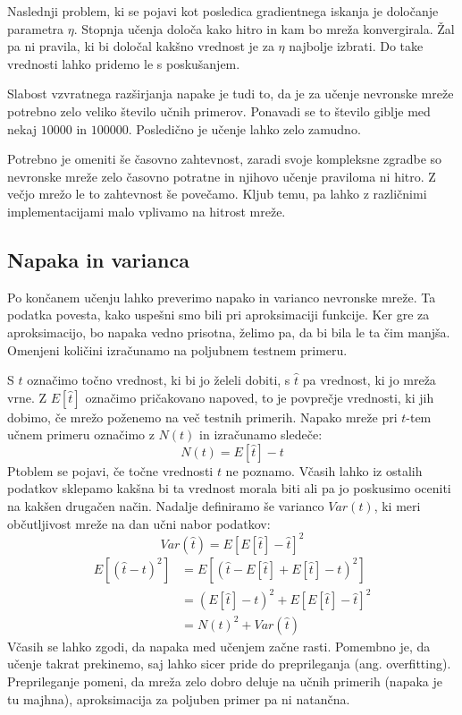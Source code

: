 \documentclass[mat1]{fmfdelo}
\begin{document}
Naslednji problem, ki se pojavi kot posledica gradientnega iskanja je določanje parametra $\eta$. Stopnja učenja določa kako hitro in kam bo mreža konvergirala. Žal pa ni pravila, ki bi določal kakšno vrednost je za $\eta$ najbolje izbrati. Do take vrednosti lahko pridemo le s poskušanjem.

Slabost vzvratnega razširjanja napake je tudi to, da je za učenje nevronske mreže potrebno zelo veliko število učnih primerov. Ponavadi se to število giblje med nekaj $10000$ in $100000$. Posledično je učenje lahko zelo zamudno.

Potrebno je omeniti še časovno zahtevnost, zaradi svoje kompleksne zgradbe so nevronske mreže zelo časovno potratne in njihovo učenje praviloma ni hitro. Z večjo mrežo le to zahtevnost še povečamo. Kljub temu, pa lahko z različnimi implementacijami malo vplivamo na hitrost mreže.
%
\subsection{Napaka in varianca}
Po končanem učenju lahko preverimo napako in varianco nevronske mreže. Ta podatka povesta, kako uspešni smo bili pri aproksimaciji funkcije. Ker gre za aproksimacijo, bo napaka vedno prisotna, želimo pa, da bi bila le ta čim manjša. Omenjeni količini izračunamo na poljubnem testnem primeru.

S $t$ označimo točno vrednost, ki bi jo želeli dobiti, s $\hat{t}$ pa vrednost, ki jo mreža vrne. Z $E[\hat{t}]$ označimo pričakovano napoved, to je povprečje vrednosti, ki jih dobimo, če mrežo poženemo na  več testnih primerih. Napako mreže pri $t$-tem učnem primeru označimo z $N(t)$ in izračunamo sledeče:
%
\begin{equation}
N(t) = E[\hat{t}] - t
\end{equation}
%
Ptoblem se pojavi, če točne vrednosti $t$ ne poznamo. Včasih lahko iz ostalih podatkov sklepamo kakšna bi ta vrednost morala biti ali pa jo poskusimo oceniti na kakšen drugačen način. Nadalje definiramo še varianco $Var(t)$, ki meri občutljivost mreže na dan učni nabor podatkov:
%
\begin{equation}
Var(\hat{t}) = E[E[\hat{t}] -\hat{t}]^2
\end{equation}
%
\begin{equation}
\begin{aligned}
E[(\hat{t}-t)^2] &= E[(\hat{t} -E[\hat{t}] + E[\hat{t}] - t)^2]  \\
&= (E[\hat{t}] - t)^2 +E[E[\hat{t}] -\hat{t}]^2\\
&= N(t)^2 + Var(\hat{t})
\end{aligned}
\end{equation}
%
Včasih se lahko zgodi, da napaka med učenjem začne rasti. Pomembno je, da učenje takrat prekinemo, saj lahko sicer pride do preprileganja (ang. overfitting). Preprileganje pomeni, da mreža zelo dobro deluje na učnih primerih (napaka je tu majhna), aproksimacija za poljuben primer pa ni natančna. 
\end{document}
